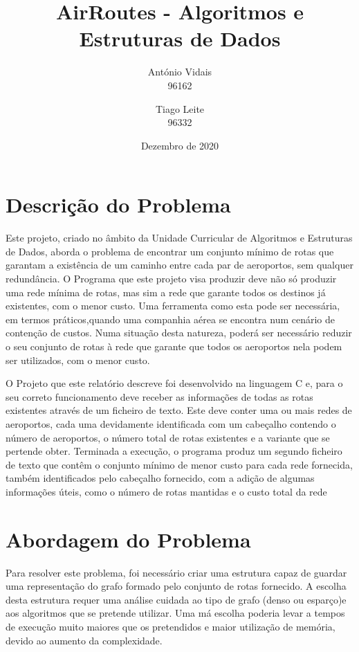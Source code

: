 \documentclass[14pt]{article}
\title{AirRoutes - Algoritmos e Estruturas de Dados}
\date{Dezembro de 2020}
\author{António Vidais \\96162 \and Tiago Leite \\96332}
\begin{document}
    \maketitle


    \section{Descrição do Problema} \label{sec:d.problema}
    Este projeto, criado no âmbito da Unidade Curricular de Algoritmos e Estruturas de Dados, aborda o problema de
    encontrar um conjunto mínimo de rotas que garantam a existência de um caminho entre cada par de aeroportos,
    sem qualquer redundância.
    O Programa que este projeto visa produzir deve não só produzir uma rede mínima de rotas, mas sim a rede que garante
    todos os destinos já existentes, com o menor custo.
    Uma ferramenta como esta pode ser necessária, em termos práticos,quando uma companhia aérea se encontra num cenário
    de contenção de custos.
    Numa situação desta natureza, poderá ser necessário reduzir o seu conjunto de rotas à rede que
    garante que todos os aeroportos nela podem ser utilizados, com o menor custo.

    O Projeto que este relatório descreve foi desenvolvido na linguagem C e, para o seu correto funcionamento deve
    receber as informações de todas as rotas existentes através de um ficheiro de texto.
    Este deve conter uma ou mais redes de aeroportos, cada uma devidamente identificada com um cabeçalho contendo o
    número de aeroportos, o número total de rotas existentes e a variante que se pertende obter.
    Terminada a execução, o programa produz um segundo ficheiro de texto que contêm o conjunto mínimo de menor custo
    para cada rede fornecida, também identificados pelo cabeçalho fornecido, com a adição de algumas informações úteis,
    como o número de rotas mantidas e o custo total da rede

    \section{Abordagem do Problema}\label{sec:abordagem.problema}
    Para resolver este problema, foi necessário criar uma estrutura capaz de guardar uma representação do grafo formado
    pelo conjunto de rotas fornecido.
    A escolha desta estrutura requer uma análise cuidada ao tipo de grafo (denso ou esparço)e aos algoritmos que se
    pretende utilizar.
    Uma má escolha poderia levar a tempos de execução muito maiores que os pretendidos e maior utilização de memória,
    devido ao aumento da complexidade.
\end{document}
